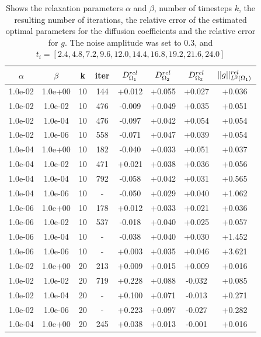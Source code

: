 \documentclass[11pt,a4paper]{article}
\begin{document}
\begin{table}[t]
\centering
\caption{Shows the relaxation parameters $\alpha$ and $\beta$, number of timesteps $k$, the resulting number of iterations, the relative error of the estimated optimal parameters for the diffusion coefficients and the relative error for $g$. The noise amplitude was set to 0.3, and $t_i =[2.4, 4.8, 7.2, 9.6, 12.0, 14.4, 16.8, 19.2, 21.6, 24.0]$  }
\begin{tabular}{*{8}c}
$\alpha$ & $\beta$ & k  & iter & $ D_{\Omega_1}\sp{rel}$ & $D_{\Omega_2}\sp{rel} $ & $D_{\Omega_3}\sp{rel} $ & $|| g ||\sp{rel}_{L\sp{2}(\Omega_1)} $ \\
\hline
 1.0e-02 	 & 1.0e+00 	 & 10 & 144 	 & +0.012 & +0.055 & +0.027 & +0.036 \\ 
 1.0e-02 	 & 1.0e-02 	 & 10 & 476 	 & -0.009 & +0.049 & +0.035 & +0.051 \\ 
 1.0e-02 	 & 1.0e-04 	 & 10 & 476 	 & -0.097 & +0.042 & +0.054 & +0.054 \\ 
 1.0e-02 	 & 1.0e-06 	 & 10 & 558 	 & -0.071 & +0.047 & +0.039 & +0.054 \\ 
 1.0e-04 	 & 1.0e+00 	 & 10 & 182 	 & -0.040 & +0.033 & +0.051 & +0.037 \\ 
 1.0e-04 	 & 1.0e-02 	 & 10 & 471 	 & +0.021 & +0.038 & +0.036 & +0.056 \\ 
 1.0e-04 	 & 1.0e-04 	 & 10 & 792 	 & -0.058 & +0.042 & +0.031 & +0.565 \\ 
 1.0e-04 	 & 1.0e-06 	 & 10 &  -   & -0.050 & +0.029 & +0.040 & +1.062 \\ 
 1.0e-06 	 & 1.0e+00 	 & 10 & 178 	 & +0.012 & +0.033 & +0.021 & +0.036 \\ 
 1.0e-06 	 & 1.0e-02 	 & 10 & 537 	 & -0.018 & +0.040 & +0.025 & +0.057 \\ 
 1.0e-06 	 & 1.0e-04 	 & 10 &  -	 & -0.038 & +0.040 & +0.030 & +1.452 \\ 
 1.0e-06 	 & 1.0e-06 	 & 10 &  - 	 & +0.003 & +0.035 & +0.046 & +3.621 \\ 
 1.0e-02 	 & 1.0e+00 	 & 20 & 213 	 & +0.009 & +0.015 & +0.009 & +0.016 \\ 
 1.0e-02 	 & 1.0e-02 	 & 20 & 719 	 & +0.228 & +0.088 & -0.032 & +0.085 \\ 
 1.0e-02 	 & 1.0e-04 	 & 20 &  -   & +0.100 & +0.071 & -0.013 & +0.271 \\ 
 1.0e-02 	 & 1.0e-06 	 & 20 &   -  & +0.223 & +0.097 & -0.027 & +0.282 \\ 
 1.0e-04 	 & 1.0e+00 	 & 20 & 245 	 & +0.038 & +0.013 & -0.001 & +0.016 \\ 

\end{tabular}
\end{table}
\end{document}
